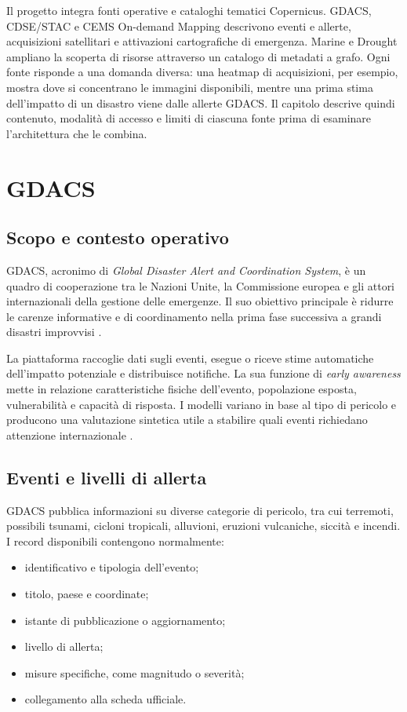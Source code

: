 Il progetto integra fonti operative e cataloghi tematici Copernicus. GDACS,
CDSE/STAC e CEMS On-demand Mapping descrivono eventi e allerte, acquisizioni
satellitari e attivazioni cartografiche di emergenza. Marine e Drought ampliano
la scoperta di risorse attraverso un catalogo di metadati a grafo. Ogni fonte
risponde a una domanda diversa: una heatmap di acquisizioni, per esempio, mostra
dove si concentrano le immagini disponibili, mentre una prima stima dell'impatto di un
disastro viene dalle allerte GDACS. Il capitolo descrive quindi contenuto, modalità di
accesso e limiti di ciascuna fonte prima di esaminare l'architettura che le
combina.

\section{GDACS}

\subsection{Scopo e contesto operativo}

GDACS, acronimo di \emph{Global Disaster Alert and Coordination System}, è un
quadro di cooperazione tra le Nazioni Unite, la Commissione europea e gli attori
internazionali della gestione delle emergenze. Il suo obiettivo principale è
ridurre le carenze informative e di coordinamento nella prima fase successiva a
grandi disastri improvvisi \cite{gdacsOverview}.

La piattaforma raccoglie dati sugli eventi, esegue o riceve stime automatiche
dell'impatto potenziale e distribuisce notifiche. La sua funzione di
\emph{early awareness} mette in relazione caratteristiche fisiche dell'evento,
popolazione esposta, vulnerabilità e capacità di risposta. I modelli variano in
base al tipo di pericolo e producono una valutazione sintetica utile a stabilire
quali eventi richiedano attenzione internazionale \cite{gdacsKnowledge}.

\subsection{Eventi e livelli di allerta}

GDACS pubblica informazioni su diverse categorie di pericolo, tra cui terremoti,
possibili tsunami, cicloni tropicali, alluvioni, eruzioni vulcaniche, siccità e
incendi. I record disponibili contengono normalmente:

\begin{itemize}
    \item identificativo e tipologia dell'evento;
    \item titolo, paese e coordinate;
    \item istante di pubblicazione o aggiornamento;
    \item livello di allerta;
    \item misure specifiche, come magnitudo o severità;
    \item collegamento alla scheda ufficiale.
\end{itemize}


